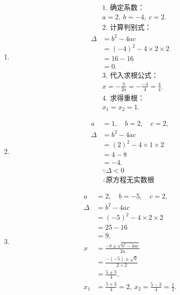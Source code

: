 \begin{solution}
\vspace{-0.8cm}
\begin{multicols}{3}
\begin{enumerate}
\vspace{-0.5cm}
    \item \begin{align*}
&\text{1. 确定系数：}\\
&a = 2,\ b = -4,\ c = 2. \\
&\text{2. 计算判别式：}\\
\Delta &= b^2 - 4ac\\
&= (-4)^2 - 4 \times 2 \times 2\\
&= 16 - 16\\
&= 0. \\
&\text{3. 代入求根公式：}\\
&x = -\frac{b}{2a} = -\frac{-4}{4} = \frac{4}{4}. \\
&\text{4. 求得重根：}\\
&x_1=x_2 = 1.
\end{align*}
    \item \begin{align*}
a &= 1, \quad b = 2, \quad c = 2, \\
\Delta &= b^2 - 4ac \\
  &= (2)^2 - 4 \times 1 \times 2 \\
  &= 4 - 8 \\
  &= -4.\\
&\because \Delta<0\\
&\therefore \text{原方程无实数根}
\end{align*}
    \item \begin{align*}
a &= 2, \quad b = -5, \quad c = 2, \\
\Delta &= b^2 - 4ac \\
  &= (-5)^2 - 4 \times 2 \times 2 \\
  &= 25 - 16 \\
  &= 9, \\
x &= \frac{-b \pm \sqrt{b^2 - 4ac}}{2a} \\
  &= \frac{-(-5) \pm \sqrt{9}}{2 \times 2} \\
  &= \frac{5 \pm 3}{4}, \\
x_1 &= \frac{5 + 3}{4} = 2, \ 
x_2 = \frac{5 - 3}{4} = \frac{1}{2}.
\end{align*}
\end{enumerate}
\end{multicols}

\end{solution}

